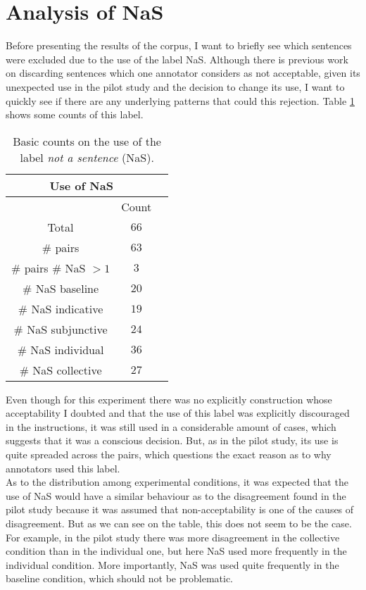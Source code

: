 \section{Analysis of NaS}
\label{sect:nas}
Before presenting the results of the corpus, I want to briefly see which sentences were excluded due to the use of the label NaS. Although there is previous work on discarding sentences which one annotator considers as not acceptable, given its unexpected use in the pilot study and the decision to change its use, I want to quickly see if there are any underlying patterns that could this rejection. Table \ref{tab:nas} shows some counts of this label.\\ 


\begin{table}
\center
\begin{tabular}{|c|c|c|}
\hline
\multicolumn{2}{|c|}{Use of NaS}\\\hline
                      & Count\\\hline 
Total & $66$\\\hline 
\# pairs & $63$ \\\hline
\# pairs \# NaS $>1$ & $3$\\\hline
\# NaS baseline & $20$\\\hline
\# NaS indicative & $19$\\\hline
\# NaS subjunctive & $24$\\\hline
\# NaS individual & $36$\\\hline
\# NaS collective& $27$\\\hline
\end{tabular}
\caption[Use of NaS]{Basic counts on the use of the label \textit{not a sentence} (NaS).}
\label{tab:nas}
\end{table}

Even though for this experiment there was no explicitly construction whose acceptability I doubted and that the use of this label was explicitly discouraged in the instructions, it was still used in a considerable amount of cases, which suggests that it was a conscious decision. But, as in the pilot study, its use is quite spreaded across the pairs, which questions the exact reason as to why annotators used this label.\\

As to the distribution among experimental conditions, it was expected that the use of NaS would have a similar behaviour as to the disagreement found in the pilot study because it was assumed that non-acceptability is one of the causes of disagreement. But as we can see on the table, this does not seem to be the case. For example, in the pilot study there was more disagreement in the collective condition than in the individual one, but here NaS used more frequently in the individual condition. More importantly, NaS was used quite frequently in the baseline condition, which should not be problematic.\\

